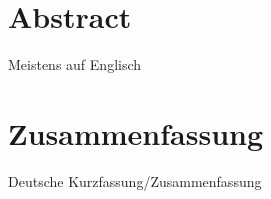 \thispagestyle{empty}

\chapter*{Abstract}
Meistens auf Englisch

\chapter*{Zusammenfassung}

Deutsche Kurzfassung/Zusammenfassung